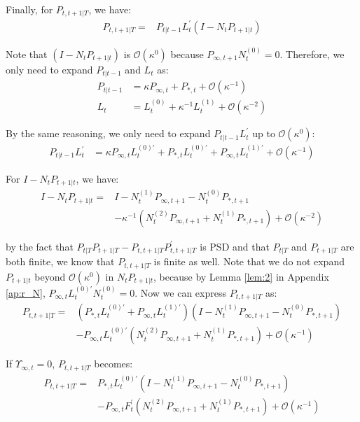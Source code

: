 \documentclass[10pt]{article}
\numberwithin{equation}{section}
\begin{document}
Finally, for $P_{t,t+1|T}$, we have:
\begin{align*}
    P_{t,t+1|T} =& P_{t|t-1}L_t^{'}(I-N_tP_{t+1|t})
\end{align*}

Note that $(I-N_tP_{t+1|t})$ is $\mathcal{O}(\kappa^0)$ because $P_{\infty,t+1}N_{t}^{(0)}=0$. Therefore, we only need to expand $P_{t|t-1}$ and $L_t$ as:
\begin{align*}
    P_{t|t-1} &= \kappa P_{\infty,t} + P_{*,t} + \mathcal{O}(\kappa^{-1}) \\
    L_t &= L_t^{(0)} + \kappa^{-1}L_t^{(1)} + \mathcal{O}(\kappa^{-2})
\end{align*}

By the same reasoning, we only need to expand $P_{t|t-1}L_t^{'}$ up to $\mathcal{O}(\kappa^0)$:
\begin{align*}
    P_{t|t-1}L_t^{'} &= \kappa P_{\infty,t}L_t^{(0)'}+P_{*,t}L_t^{(0)'}+P_{\infty,t}L_t^{(1)'}+\mathcal{O}(\kappa^{-1})
\end{align*}

For $I-N_tP_{t+1|t}$, we have:
\begin{align*}
    I-N_tP_{t+1|t} =& I-N_t^{(1)}P_{\infty,t+1}-N_t^{(0)}P_{*,t+1} \\
    &-\kappa^{-1}(N_t^{(2)}P_{\infty,t+1}+N_t^{(1)}P_{*,t+1})+\mathcal{O}(\kappa^{-2})
\end{align*}

by the fact that $P_{t|T}P_{t+1|T}-P_{t,t+1|T}P_{t,t+1|T}^{'}$ is PSD and that $P_{t|T}$ and $P_{t+1|T}$ are both finite, we know that $P_{t,t+1|T}$ is finite as well. Note that we do not expand $P_{t+1|t}$ beyond $\mathcal{O}(\kappa^0)$ in $N_tP_{t+1|t}$, because by Lemma \ref{lem:2} in Appendix \ref{ap:r_N}, $P_{\infty,t}L_t^{(0)'}N_t^{(0)}=0$. Now we can express $P_{t,t+1|T}$ as:
\begin{align*}
    P_{t,t+1|T} =& (P_{*,t}L_t^{(0)'}+P_{\infty,t}L_t^{(1)'})(I-N_t^{(1)}P_{\infty,t+1}-N_t^{(0)}P_{*,t+1}) \\
    &- P_{\infty,t}L_t^{(0)'}(N_t^{(2)}P_{\infty,t+1}+N_t^{(1)}P_{*,t+1}) + \mathcal{O}(\kappa^{-1})
\end{align*}

If $\Upsilon_{\infty,t}=0$, $P_{t,t+1|T}$ becomes:
\begin{align*}
    P_{t,t+1|T} =& P_{*,t}L_t^{(0)'}(I-N_t^{(1)}P_{\infty,t+1}-N_t^{(0)}P_{*,t+1}) \\
    &- P_{\infty,t}F_t^{'}(N_t^{(2)}P_{\infty,t+1}+N_t^{(1)}P_{*,t+1}) + \mathcal{O}(\kappa^{-1})
\end{align*}
\end{document}
